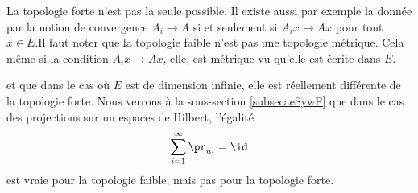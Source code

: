 La topologie forte n'est pas la seule possible. Il existe aussi par exemple la  donnée par la notion de convergence \( A_i\to A\) si et seulement si \( A_ix\to Ax\) pour tout \( x\in E\).Il faut noter que la topologie faible n'est pas une topologie métrique. Cela même si la condition \( A_ix\to Ax\), elle, est métrique vu qu'elle est écrite dans \( E\).

et que dans le cas où \( E\) est de dimension infinie, elle est réellement différente de la topologie forte. Nous verrons à la sous-section \ref{subsecaeSywF} que dans le cas des projections sur un espaces de Hilbert, l'égalité
\begin{equation}
    \sum_{i=1}^{\infty}\pr_{u_i}=\id
\end{equation}
est vraie pour la topologie faible, mais pas pour la topologie forte.


